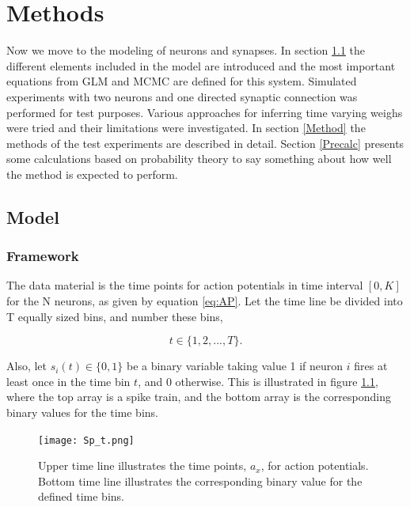 
\chapter{Methods}

Now we move to the modeling of neurons and synapses. In section \ref{set_up} the different elements included in the model are introduced and the most important equations from GLM and MCMC are defined for this system. Simulated experiments with two neurons and one directed synaptic connection was performed for test purposes. Various approaches for inferring time varying weighs were tried and their limitations were investigated. In section \ref{Method} the methods of the test experiments are described in detail. Section \ref{Precalc} presents some calculations based on probability theory to say something about how well the method is expected to perform.

\section{Model}
\label{set_up}

\subsection{Framework}
The data material is the time points for action potentials in time interval $[0,K]$ for the N neurons, as given by equation \ref{eq:AP}. Let the time line be divided into T equally sized bins, and number these bins,

\begin{equation}
    t \in \{1, 2, ..., T\}.
\end{equation}

Also, let $s_{i}(t) \in \{0,1\}$ be a binary variable taking value 1 if neuron $i$ fires at least once in the time bin $t$, and 0 otherwise. This is illustrated in figure \ref{fig:spike_train}, where the top array is a spike train, and the bottom array is the corresponding binary values for the time bins.

\begin{figure}[h]
\caption{Upper time line illustrates the time points, $a_x$, for action potentials. Bottom time line illustrates the corresponding binary value for the defined time bins.}
\label{fig:spike_train}
    \centering
    \texttt{[image: Sp\_t.png]}
\end{figure} 


